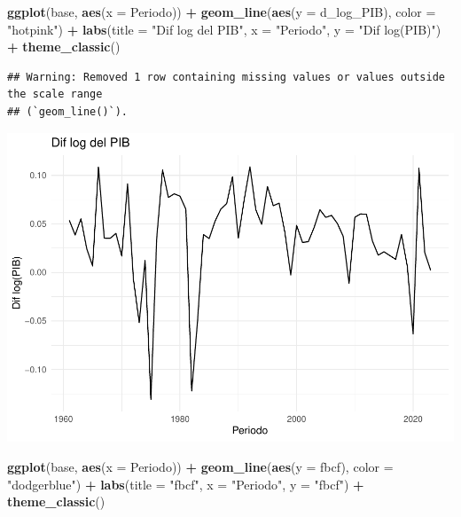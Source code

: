 \documentclass[
  12pt,
]{article}
\newenvironment{Shaded}{\begin{snugshade}}{\end{snugshade}}
\newcommand{\AttributeTok}[1]{\textcolor[rgb]{0.13,0.29,0.53}{#1}}
\newcommand{\FunctionTok}[1]{\textcolor[rgb]{0.13,0.29,0.53}{\textbf{#1}}}
\newcommand{\NormalTok}[1]{#1}
\newcommand{\SpecialCharTok}[1]{\textcolor[rgb]{0.81,0.36,0.00}{\textbf{#1}}}
\newcommand{\StringTok}[1]{\textcolor[rgb]{0.31,0.60,0.02}{#1}}
\begin{document}
\begin{Shaded}
\begin{Highlighting}[]
\FunctionTok{ggplot}\NormalTok{(base, }\FunctionTok{aes}\NormalTok{(}\AttributeTok{x =}\NormalTok{ Periodo)) }\SpecialCharTok{+}
  \FunctionTok{geom\_line}\NormalTok{(}\FunctionTok{aes}\NormalTok{(}\AttributeTok{y =}\NormalTok{ d\_log\_PIB), }\AttributeTok{color =} \StringTok{"hotpink"}\NormalTok{) }\SpecialCharTok{+}
  \FunctionTok{labs}\NormalTok{(}\AttributeTok{title =} \StringTok{"Dif log del PIB"}\NormalTok{, }\AttributeTok{x =} \StringTok{"Periodo"}\NormalTok{, }\AttributeTok{y =} \StringTok{"Dif log(PIB)"}\NormalTok{) }\SpecialCharTok{+}
  \FunctionTok{theme\_classic}\NormalTok{()}
\end{Highlighting}
\end{Shaded}

\begin{verbatim}
## Warning: Removed 1 row containing missing values or values outside the scale range
## (`geom_line()`).
\end{verbatim}

\includegraphics{Ejercicio-4_files/figure-latex/unnamed-chunk-4-1.pdf}

\begin{Shaded}
\begin{Highlighting}[]
\FunctionTok{ggplot}\NormalTok{(base, }\FunctionTok{aes}\NormalTok{(}\AttributeTok{x =}\NormalTok{ Periodo)) }\SpecialCharTok{+}
  \FunctionTok{geom\_line}\NormalTok{(}\FunctionTok{aes}\NormalTok{(}\AttributeTok{y =}\NormalTok{ fbcf), }\AttributeTok{color =} \StringTok{"dodgerblue"}\NormalTok{) }\SpecialCharTok{+}
  \FunctionTok{labs}\NormalTok{(}\AttributeTok{title =} \StringTok{"fbcf"}\NormalTok{, }\AttributeTok{x =} \StringTok{"Periodo"}\NormalTok{, }\AttributeTok{y =} \StringTok{"fbcf"}\NormalTok{) }\SpecialCharTok{+}
  \FunctionTok{theme\_classic}\NormalTok{()}
\end{Highlighting}
\end{Shaded}
\end{document}
